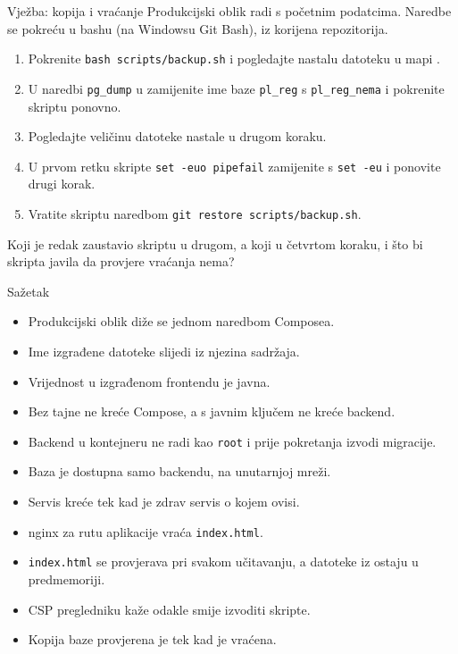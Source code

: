 \begin{frame}{Vježba: kopija i vraćanje}
Produkcijski oblik radi s početnim podatcima. Naredbe se pokreću u bashu (na Windowsu Git Bash), iz korijena repozitorija.

\vspace{0.8em}
\begin{enumerate}
  \itemsep0.4em
  \item Pokrenite \texttt{bash scripts/backup.sh} i pogledajte nastalu datoteku u mapi .
  \item U naredbi \texttt{pg\_dump} u  zamijenite ime baze \texttt{pl\_reg} s \texttt{pl\_reg\_nema} i pokrenite skriptu ponovno.
  \item Pogledajte veličinu datoteke nastale u drugom koraku.
  \item U prvom retku skripte \texttt{set -euo pipefail} zamijenite s \texttt{set -eu} i ponovite drugi korak.
  \item Vratite skriptu naredbom \texttt{git restore scripts/backup.sh}.
\end{enumerate}

\vspace{0.8em}
Koji je redak zaustavio skriptu u drugom, a koji u četvrtom koraku, i što bi skripta javila da provjere vraćanja nema?
\end{frame}

\begin{frame}{Sažetak}
\begin{itemize}
  \itemsep0.3em
  \item Produkcijski oblik diže se jednom naredbom Composea.
  \item Ime izgrađene datoteke slijedi iz njezina sadržaja.
  \item Vrijednost u izgrađenom frontendu je javna.
  \item Bez tajne ne kreće Compose, a s javnim ključem ne kreće backend.
  \item Backend u kontejneru ne radi kao \texttt{root} i prije pokretanja izvodi migracije.
  \item Baza je dostupna samo backendu, na unutarnjoj mreži.
  \item Servis kreće tek kad je zdrav servis o kojem ovisi.
  \item nginx za rutu aplikacije vraća \texttt{index.html}.
  \item \texttt{index.html} se provjerava pri svakom učitavanju, a datoteke iz  ostaju u predmemoriji.
  \item CSP pregledniku kaže odakle smije izvoditi skripte.
  \item Kopija baze provjerena je tek kad je vraćena.
\end{itemize}
\end{frame}


